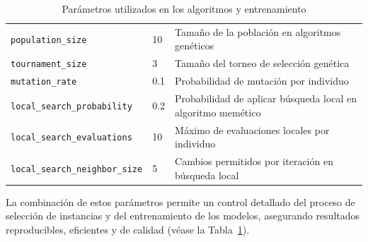 \begin{table}[H]
{\begin{tabular}{@{}llp{7.5cm}@{}}
            \texttt{population\_size}                       & 10                                      & Tamaño de la población en algoritmos genéticos                 \\
            \texttt{tournament\_size}                       & 3                                       & Tamaño del torneo de selección genética                        \\
            \texttt{mutation\_rate}                         & 0.1                                     & Probabilidad de mutación por individuo                         \\
            \texttt{local\_search\_probability}             & 0.2                                     & Probabilidad de aplicar búsqueda local en algoritmo memético   \\
            \texttt{local\_search\_evaluations}             & 10                                      & Máximo de evaluaciones locales por individuo                   \\
            \texttt{local\_search\_neighbor\_size}          & 5                                       & Cambios permitidos por iteración en búsqueda local             \\ \bottomrule
        \end{tabular}
    }
    \caption{Parámetros utilizados en los algoritmos y entrenamiento}
    \label{tab:parametros-generales}
\end{table}

La combinación de estos parámetros permite un control detallado del proceso de selección de instancias y del entrenamiento de los modelos,
asegurando resultados reproducibles, eficientes y de calidad (véase la Tabla~\ref{tab:parametros-generales}).
